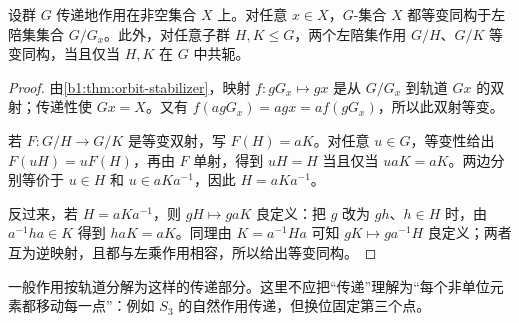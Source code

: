 \begin{proposition}\label{b1:prop:transitive-coset}
	设群 \(G\) 传递地作用在非空集合 \(X\) 上。对任意 \(x\in X\)，\(G\)-集合 \(X\) 都等变同构于左陪集集合 \(G/G_x\)。此外，对任意子群 \(H,K\leq G\)，两个左陪集作用 \(G/H\)、\(G/K\) 等变同构，当且仅当 \(H,K\) 在 \(G\) 中共轭。
\end{proposition}
\begin{proof}
	由\cref{b1:thm:orbit-stabilizer}，映射 \(f:gG_x\mapsto gx\) 是从 \(G/G_x\) 到轨道 \(Gx\) 的双射；传递性使 \(Gx=X\)。又有 \(f(agG_x)=agx=af(gG_x)\)，所以此双射等变。

	若 \(F:G/H\rightarrow G/K\) 是等变双射，写 \(F(H)=aK\)。对任意 \(u\in G\)，等变性给出 \(F(uH)=uF(H)\)，再由 \(F\) 单射，得到 \(uH=H\) 当且仅当 \(uaK=aK\)。两边分别等价于 \(u\in H\) 和 \(u\in aKa^{-1}\)，因此 \(H=aKa^{-1}\)。

	反过来，若 \(H=aKa^{-1}\)，则 \(gH\mapsto gaK\) 良定义：把 \(g\) 改为 \(gh\)、\(h\in H\) 时，由 \(a^{-1}ha\in K\) 得到 \(haK=aK\)。同理由 \(K=a^{-1}Ha\) 可知 \(gK\mapsto ga^{-1}H\) 良定义；两者互为逆映射，且都与左乘作用相容，所以给出等变同构。
\end{proof}

一般作用按轨道分解为这样的传递部分。这里不应把“传递”理解为“每个非单位元素都移动每一点”：例如 \(S_3\) 的自然作用传递，但换位固定第三个点。

